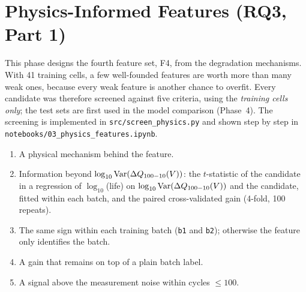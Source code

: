 \FloatBarrier
\section{Physics-Informed Features (RQ3, Part 1)}
\label{sec:physics}

This phase designs the fourth feature set, F4, from the degradation
mechanisms. With 41 training cells, a few well-founded features are worth more
than many weak ones, because every weak feature is another chance to overfit.
Every candidate was therefore screened against five criteria, using the
\emph{training cells only}; the test sets are first used in the model
comparison (Phase~4). The screening is implemented in
\texttt{src/screen\_physics.py} and shown step by step in
\texttt{notebooks/03\_physics\_features.ipynb}.
\begin{enumerate}
  \item A physical mechanism behind the feature.
  \item Information beyond $\log_{10}\mathrm{Var}(\Delta Q_{100-10}(V))$: the $t$-statistic of
  the candidate in a regression of $\log_{10}$(life) on $\log_{10}\mathrm{Var}(\Delta Q_{100-10}(V))$
  and the candidate, fitted within each batch, and the paired
  cross-validated gain (4-fold, 100 repeats).
  \item The same sign within each training batch (\texttt{b1} and
  \texttt{b2}); otherwise the feature only identifies the batch.
  \item A gain that remains on top of a plain batch label.
  \item A signal above the measurement noise within cycles $\le 100$.
\end{enumerate}

